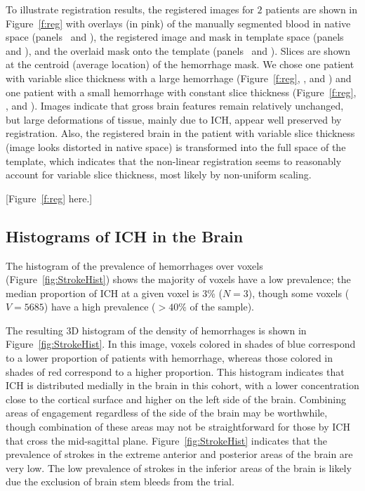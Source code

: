 \documentclass[10pt]{article}\usepackage[]{graphicx}\usepackage[]{color}
\begin{document}
To illustrate registration results, the registered images for $2$ patients are shown in Figure~\ref{f:reg} with overlays (in pink) of the manually segmented blood in native space (panels~\protect{} and \protect{}), the registered image and mask in template space (panels~\protect{} and \protect{}), and the overlaid mask onto the template (panels~\protect{} and \protect{}).  Slices are shown at the centroid (average location) of the hemorrhage mask.  We chose one patient with variable slice thickness with a large hemorrhage (Figure~\ref{f:reg}\protect{}, \protect{}, and \protect{}) and one patient with a small hemorrhage with constant slice thickness (Figure~\ref{f:reg}\protect{}, \protect{}, and \protect{}).  Images indicate that gross brain features remain relatively unchanged, but large deformations of tissue, mainly due to ICH, appear well preserved by registration.  Also, the registered brain in the patient with variable slice thickness (image looks distorted in native space) is transformed into the full space of the template, which indicates that the non-linear registration seems to reasonably account for variable slice thickness, most likely by non-uniform scaling.

[Figure~\ref{f:reg} here.]


\subsection{Histograms of ICH in the Brain}




The histogram of the prevalence of hemorrhages over voxels (Figure~\ref{fig:StrokeHist}\protect{}) shows the majority of voxels have a low prevalence; the median proportion of ICH at a given voxel is 3\% ($N = 3$), though some voxels ($V = 5685$) have a high prevalence ($> 40\%$ of the sample).  


The resulting 3D histogram of the density of hemorrhages is shown in Figure~\ref{fig:StrokeHist}\protect{}.
In this image, voxels colored in shades of blue correspond to a lower proportion of
patients with hemorrhage, whereas those colored in shades of red correspond to a higher proportion. This histogram indicates that ICH is
distributed medially in the brain in this cohort, with a lower concentration
close to the cortical surface and higher on the left side of the brain.  Combining areas of engagement regardless of the side of the brain may be worthwhile, though combination of these areas may not be straightforward for those by ICH that cross the mid-sagittal plane.  
Figure~\ref{fig:StrokeHist}\protect{} indicates that the prevalence of strokes in the extreme anterior and posterior areas of the brain are very low.  The low prevalence of strokes in the inferior areas of the brain is likely due the exclusion of brain stem bleeds from the trial.  
\end{document}
